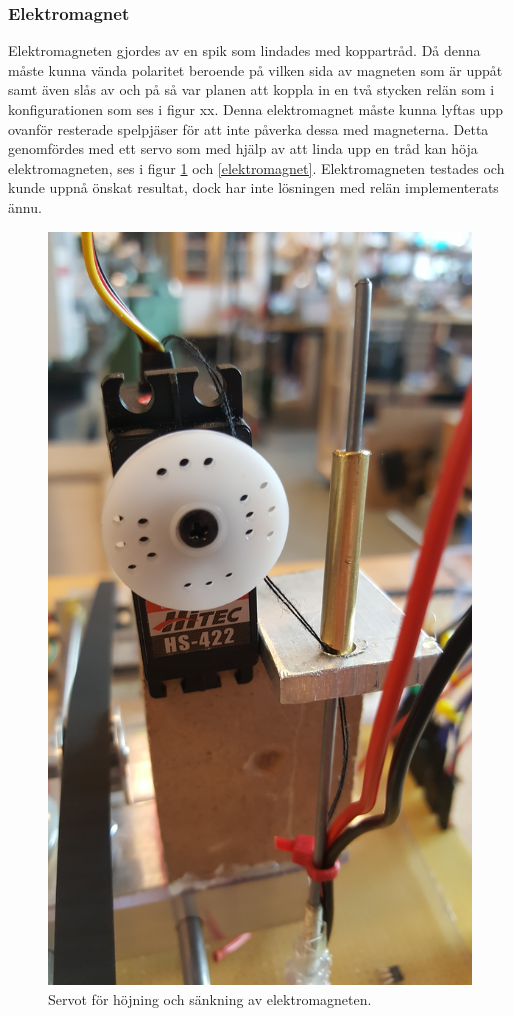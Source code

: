 \documentclass[a4paper]{article}
\begin{document}
\subsubsection*{Elektromagnet}
Elektromagneten gjordes av en spik som lindades med koppartråd. Då denna måste kunna vända polaritet beroende på vilken sida av magneten som är uppåt samt även slås av och på så var planen att koppla in en två stycken relän som i konfigurationen som ses i figur xx. Denna elektromagnet måste kunna lyftas upp ovanför resterade spelpjäser för att inte påverka dessa med magneterna. Detta genomfördes med ett servo som med hjälp av att linda upp en tråd kan höja elektromagneten, ses i figur \ref{servo_fram} och \ref{elektromagnet}. Elektromagneten testades och kunde uppnå önskat resultat, dock har inte lösningen med relän implementerats ännu.
\begin{figure}\label{servo_fram}
\centering
\includegraphics[scale=0.6]{../images/servo_fram}
\caption{Servot för höjning och sänkning av elektromagneten.}
\end{figure}
\end{document}
